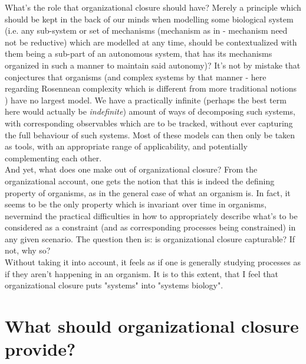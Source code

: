 \documentclass[a4paper,12pt,twoside,leqno]{article}
\begin{document}
What's the role that organizational closure should have? Merely a principle which should be kept in the back of our minds when modelling some biological system (i.e. any sub-system or set of mechanisms (mechanism as in \cite{bich2021mechanism, bechtel2011mechanism} - mechanism need not be reductive) which are modelled at any time, should be contextualized with them being a sub-part of an autonomous system, that has its mechanisms organized in such a manner to maintain said autonomy)? It's not by mistake that \cite{rosen1991life} conjectures that organisms (and complex systems by that manner - here regarding Rosennean complexity which is different from more traditional notions \citep{rosen1991life}) have no largest model. We have a practically infinite (perhaps the best term here would actually be \textit{indefinite}) amount of ways of decomposing such systems, with corresponding observables which are to be tracked, without ever capturing the full behaviour of such systems. Most of these models can then only be taken as tools, with an appropriate range of applicability, and potentially complementing each other.\\
And yet, what does one make out of organizational closure? From the organizational account, one gets the notion that this is indeed the defining property of organisms, as in the general case of what an organism is. In fact, it seems to be the only property which is invariant over time in organisms, nevermind the practical difficulties in how to appropriately describe what's to be considered as a constraint (and as corresponding processes being constrained) in any given scenario. The question then is: is organizational closure capturable? If not, why so?\\
Without taking it into account, it feels as if one is generally studying processes as if they aren't happening in an organism. It is to this extent, that I feel that organizational closure puts "systems" into "systems biology".

\section{What should organizational closure provide?}



\end{document}
